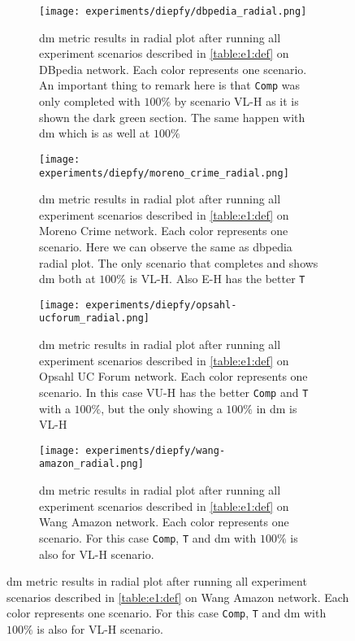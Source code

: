\begin{figure}[!htp]
  \centering
  \begin{subfigure}[t]{0.45\textwidth}
  \texttt{[image: experiments/diepfy/dbpedia\_radial.png]}
    \caption[{[EE] \acrshort{dm} Results (Radial): \acrshort{dbpedia}}]{\acrshort{dm} metric results in radial plot after running all experiment scenarios described in \autoref{table:e1:def} on DBpedia network. Each color represents one scenario. An important thing to remark here is that \texttt{Comp} was only completed with $100\%$ by scenario VL-H as it is shown the dark green section. The same happen with \acrshort{dm} which is as well at $100\%$}
    \label{fig:dief:dbpedia-radial}
  \end{subfigure}\hfill
  \begin{subfigure}[t]{0.45\textwidth}
  \texttt{[image: experiments/diepfy/moreno\_crime\_radial.png]}
    \caption[{[EE] \acrshort{dm} Results (Radial): Moreno Crime}]{\acrshort{dm} metric results in radial plot after running all experiment scenarios described in \autoref{table:e1:def} on Moreno Crime network. Each color represents one scenario. Here we can observe the same as dbpedia radial plot. The only scenario that completes and shows \acrshort{dm} both at $100\%$ is VL-H. Also E-H has the better \texttt{T}}
    \label{fig:dief:moreno-radial}
  \end{subfigure}
  \vspace{0.5cm}
  \begin{subfigure}[t]{0.45\textwidth}
  \texttt{[image: experiments/diepfy/opsahl-ucforum\_radial.png]}
    \caption[{[EE] \acrshort{dm} Results (Radial): Opsahl UC Forum}]{\acrshort{dm} metric results in radial plot after running all experiment scenarios described in \autoref{table:e1:def} on Opsahl UC Forum network. Each color represents one scenario. In this case VU-H has the better \texttt{Comp} and \texttt{T} with a $100\%$, but the only showing a $100\%$ in \acrshort{dm} is VL-H}
    \label{fig:dief:opsahl-radial}
  \end{subfigure}\hfill
  \begin{subfigure}[t]{0.45\textwidth}
    \texttt{[image: experiments/diepfy/wang-amazon\_radial.png]}
    \caption[{[EE] \acrshort{dm} Results (Radial): Wang Amazon}]{\acrshort{dm} metric results in radial plot after running all experiment scenarios described in \autoref{table:e1:def} on Wang Amazon network. Each color represents one scenario. For this case \texttt{Comp}, \texttt{T} and \acrshort{dm} with $100\%$ is also for VL-H scenario.}

\end{subfigure}
\end{figure}
